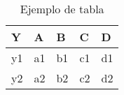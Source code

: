 \begin{table}[h]
	\centering
	\begin{tabular}{l|llll}
		Y & A & B & C & D\\
		\hline
		y1 & a1 & b1 & c1 & d1\\
		y2 & a2 & b2 & c2 & d2\\
	\end{tabular}
	\caption {Ejemplo de tabla}\label{tab:ejemplo}
\end{table}
